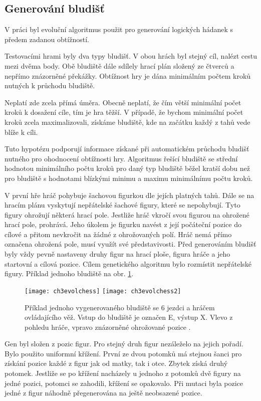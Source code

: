 \subsection{Generování bludišť}

V práci \cite{17Evol} byl evoluční algoritmus použit pro generování logických hádanek s předem zadanou obtížností.

Testovacími hrami byly dva typy bludišť. V obou hrách byl stejný cíl, nalézt cestu mezi dvěma body. Obě bludiště dále sdílely hrací plán složený ze čtverců a nepřímo znázorněné překážky. Obtížnost hry je dána minimálním počtem kroků nutných k průchodu bludiště. 

Neplatí zde zcela přímá úměra. Obecně neplatí, že čím větší minimální počet kroků k dosažení cíle, tím je hra těžší. V případě, že bychom minimální počet kroků zcela maximalizovali, získáme bludiště, kde na začátku každý z tahů vede blíže k cíli. 

Tuto hypotézu podporují informace získané při automatickém průchodu bludišť nutného pro ohodnocení obtížnosti hry. Algoritmus řešící bludiště se střední hodnotou minimálního počtu kroků pro daný typ bludiště běžel kratší dobu než pro bludiště s hodnotami blízkými minimu a maximu minimálnímu počtu kroků.

V první hře hráč pohybuje šachovou figurkou dle jejích platných tahů. Dále se na hracím plánu vyskytují nepřátelské šachové figury, které se nepohybují. Tyto figury ohrožují některá hrací pole. Jestliže hráč vkročí svou figurou na ohrožené hrací pole, prohrává. Jeho úkolem je figurku navést z její počáteční pozice do cílové a přitom nevkročit na žádné z ohrožovaných polí. Hráč nemá přímo označena ohrožená pole, musí využít své představivosti. Před generováním bludišť byly vždy pevně nastaveny druhy figur na hrací ploše, figura hráče a jeho startovní a cílová pozice. Cílem genetického algoritmu bylo rozmístit nepřátelské figury. Příklad jednoho bludiště na obr. \ref{fig-ch3evolchess}.

\begin{figure}
  \centering
  \texttt{[image: ch3evolchess]}
	\texttt{[image: ch3evolchess2]}
	\caption{Příklad jednoho vygenerovaného bludiště se 6 jezdci a hráčem ovládajícího věž. Vstup do bludiště je označen E, výstup X. Vlevo z pohledu hráče, vpravo znázorněné ohrožované pozice \cite{17Evol}. }
	\label{fig-ch3evolchess}
\end{figure}

Gen byl složen z pozic figur. Pro stejný druh figur nezáleželo na jejich pořadí. Bylo použito uniformní křížení. První ze dvou potomků má stejnou šanci pro získání pozice každé z figur jak od matky, tak i otce. Zbytek získá druhý potomek. Jestliže se po křížení nacházely u jednoho z potomků dvě figury na jedné pozici, potomci se zahodili, křížení se opakovalo. Při mutaci byla pozice jedné z figur náhodně přegenerována na ještě neobsazené pozice.

